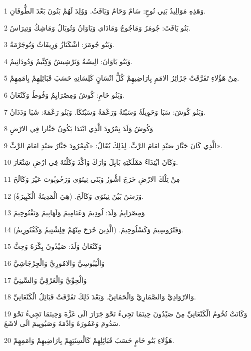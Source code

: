 \par 1 وَهَذِهِ مَوَالِيدُ بَنِي نُوحٍ: سَامٌ وَحَامٌ وَيَافَثُ. وَوُلِدَ لَهُمْ بَنُونَ بَعْدَ الطُّوفَانِ.
\par 2 بَنُو يَافَثَ: جُومَرُ وَمَاجُوجُ وَمَادَاي وَيَاوَانُ وَتُوبَالُ وَمَاشِكُ وَتِيرَاسُ.
\par 3 وَبَنُو جُومَرَ: اشْكَنَازُ وَرِيفَاثُ وَتُوجَرْمَةُ.
\par 4 وَبَنُو يَاوَانَ: الِيشَةُ وَتَرْشِيشُ وَكِتِّيمُ وَدُودَانِيمُ.
\par 5 مِنْ هَؤُلاءِ تَفَرَّقَتْ جَزَائِرُ الامَمِ بِارَاضِيهِمْ كُلُّ انْسَانٍ كَلِسَانِهِ حَسَبَ قَبَائِلِهِمْ بِامَمِهِمْ.
\par 6 وَبَنُو حَامٍ: كُوشُ وَمِصْرَايِمُ وَفُوطُ وَكَنْعَانُ.
\par 7 وَبَنُو كُوشَ: سَبَا وَحَوِيلَةُ وَسَبْتَةُ وَرَعْمَةُ وَسَبْتَكَا. وَبَنُو رَعْمَةَ: شَبَا وَدَدَانُ.
\par 8 وَكُوشُ وَلَدَ نِمْرُودَ الَّذِي ابْتَدَا يَكُونُ جَبَّارا فِي الارْضِ
\par 9 الَّذِي كَانَ جَبَّارَ صَيْدٍ امَامَ الرَّبِّ. لِذَلِكَ يُقَالُ: «كَنِمْرُودَ جَبَّارُ صَيْدٍ امَامَ الرَّبِّ».
\par 10 وَكَانَ ابْتِدَاءُ مَمْلَكَتِهِ بَابِلَ وَارَكَ وَاكَّدَ وَكَلْنَةَ فِي ارْضِ شِنْعَارَ.
\par 11 مِنْ تِلْكَ الارْضِ خَرَجَ اشُّورُ وَبَنَى نِينَوَى وَرَحُوبُوتَ عَيْرَ وَكَالَحَ
\par 12 وَرَسَنَ بَيْنَ نِينَوَى وَكَالَحَ. (هِيَ الْمَدِينَةُ الْكَبِيرَةُ).
\par 13 وَمِصْرَايِمُ وَلَدَ: لُودِيمَ وَعَنَامِيمَ وَلَهَابِيمَ وَنَفْتُوحِيمَ
\par 14 وَفَتْرُوسِيمَ وَكَسْلُوحِيمَ. (الَّذِينَ خَرَجَ مِنْهُمْ فِلِشْتِيمُ وَكَفْتُورِيمُ).
\par 15 وَكَنْعَانُ وَلَدَ: صَيْدُونَ بِكْرَهُ وَحِثَّ
\par 16 وَالْيَبُوسِيَّ وَالامُورِيَّ وَالْجِرْجَاشِيَّ
\par 17 وَالْحِوِّيَّ وَالْعَرْقِيَّ وَالسِّينِيَّ
\par 18 وَالارْوَادِيَّ وَالصَّمَارِيَّ وَالْحَمَاتِيَّ. وَبَعْدَ ذَلِكَ تَفَرَّقَتْ قَبَائِلُ الْكَنْعَانِيِّ.
\par 19 وَكَانَتْ تُخُومُ الْكَنْعَانِيِّ مِنْ صَيْدُونَ حِينَمَا تَجِيءُ نَحْوَ جَرَارَ الَى غَزَّةَ وَحِينَمَا تَجِيءُ نَحْوَ سَدُومَ وَعَمُورَةَ وَادْمَةَ وَصَبُويِيمَ الَى لاشَعَ.
\par 20 هَؤُلاءِ بَنُو حَامٍ حَسَبَ قَبَائِلِهِمْ كَالْسِنَتِهِمْ بِارَاضِيهِمْ وَامَمِهِمْ.
